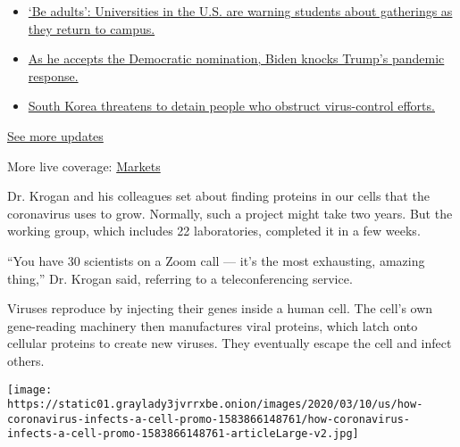 \begin{itemize}
\tightlist
\item
  \href{https://www.nytimes3xbfgragh.onion/2020/08/21/world/covid-19-coronavirus.html?action=click\&pgtype=Article\&state=default\&region=MAIN_CONTENT_1\&context=storylines_live_updates\#link-6a60a19d}{`Be
  adults': Universities in the U.S. are warning students about
  gatherings as they return to campus.}
\item
  \href{https://www.nytimes3xbfgragh.onion/2020/08/21/world/covid-19-coronavirus.html?action=click\&pgtype=Article\&state=default\&region=MAIN_CONTENT_1\&context=storylines_live_updates\#link-324af071}{As
  he accepts the Democratic nomination, Biden knocks Trump's pandemic
  response.}
\item
  \href{https://www.nytimes3xbfgragh.onion/2020/08/21/world/covid-19-coronavirus.html?action=click\&pgtype=Article\&state=default\&region=MAIN_CONTENT_1\&context=storylines_live_updates\#link-191d44be}{South
  Korea threatens to detain people who obstruct virus-control efforts.}
\end{itemize}

\href{https://www.nytimes3xbfgragh.onion/2020/08/21/world/covid-19-coronavirus.html?action=click\&pgtype=Article\&state=default\&region=MAIN_CONTENT_1\&context=storylines_live_updates}{See
more updates}

More live coverage:
\href{https://www.nytimes3xbfgragh.onion/live/2020/08/21/business/stock-market-today-coronavirus?action=click\&pgtype=Article\&state=default\&region=MAIN_CONTENT_1\&context=storylines_live_updates}{Markets}

Dr. Krogan and his colleagues set about finding proteins in our cells
that the coronavirus uses to grow. Normally, such a project might take
two years. But the working group, which includes 22 laboratories,
completed it in a few weeks.

``You have 30 scientists on a Zoom call --- it's the most exhausting,
amazing thing,'' Dr. Krogan said, referring to a teleconferencing
service.

Viruses reproduce by injecting their genes inside a human cell. The
cell's own gene-reading machinery then manufactures viral proteins,
which latch onto cellular proteins to create new viruses. They
eventually escape the cell and infect others.

\href{https://www.nytimes3xbfgragh.onion/interactive/2020/03/11/science/how-coronavirus-hijacks-your-cells.html}{}

\texttt{[image: https://static01.graylady3jvrrxbe.onion/images/2020/03/10/us/how-coronavirus-infects-a-cell-promo-1583866148761/how-coronavirus-infects-a-cell-promo-1583866148761-articleLarge-v2.jpg]}

